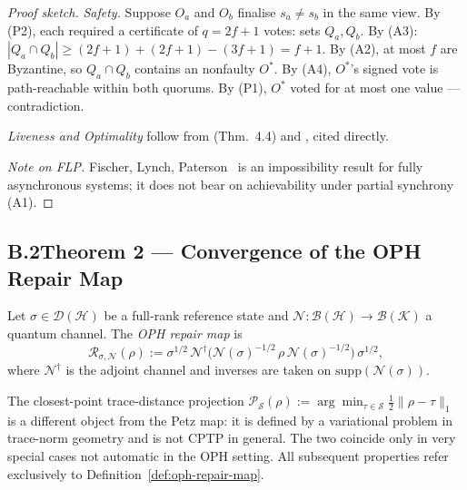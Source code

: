 \begin{proof}[Proof sketch]
\textit{Safety.}
Suppose $O_a$ and $O_b$ finalise $s_a\neq s_b$ in the same view.
By (P2), each required a certificate of $q=2f+1$ votes: sets $Q_a,Q_b$.
By (A3): $|Q_a\cap Q_b|\geq(2f+1)+(2f+1)-(3f+1)=f+1$.
By (A2), at most $f$ are Byzantine, so $Q_a\cap Q_b$ contains an
nonfaulty $O^*$.
By (A4), $O^*$'s signed vote is path-reachable within both quorums.
By (P1), $O^*$ voted for at most one value --- contradiction.

\textit{Liveness and Optimality}
follow from \cite{DLS88} (Thm.~4.4) and \cite{Lamport1982}, cited directly.

\textit{Note on FLP.}
Fischer, Lynch, Paterson~\cite{FLP85} is an impossibility result for
fully asynchronous systems; it does not bear on achievability under
partial synchrony (A1).
\end{proof}

\subsection*{B.2\quad Theorem 2 --- Convergence of the OPH Repair Map}

\begin{definition}
\label{def:oph-repair-map}
Let $\sigma\in\mathcal{D}(\mathcal{H})$ be a full-rank reference state and
$\mathcal{N}:\mathcal{B}(\mathcal{H})\to\mathcal{B}(\mathcal{K})$ a quantum channel.
The \emph{OPH repair map} is
\[
  \mathcal{R}_{\sigma,\mathcal{N}}(\rho)
  := \sigma^{1/2}\,
     \mathcal{N}^\dagger\!\bigl(
       \mathcal{N}(\sigma)^{-1/2}\,\rho\,\mathcal{N}(\sigma)^{-1/2}
     \bigr)
     \,\sigma^{1/2},
\]
where $\mathcal{N}^\dagger$ is the adjoint channel and inverses are
taken on $\mathrm{supp}(\mathcal{N}(\sigma))$.
\end{definition}

\begin{remark}
The closest-point trace-distance projection
$\mathcal{P}_{\mathcal{S}}(\rho):=\arg\min_{\tau\in\mathcal{S}}\tfrac12\|\rho-\tau\|_1$
is a different object from the Petz map: it is defined by a variational
problem in trace-norm geometry and is not \textrm{CPTP} in general.
The two coincide only in very special cases not automatic in the
\textrm{OPH} setting.
All subsequent properties refer exclusively to
Definition~\ref{def:oph-repair-map}.
\end{remark}

